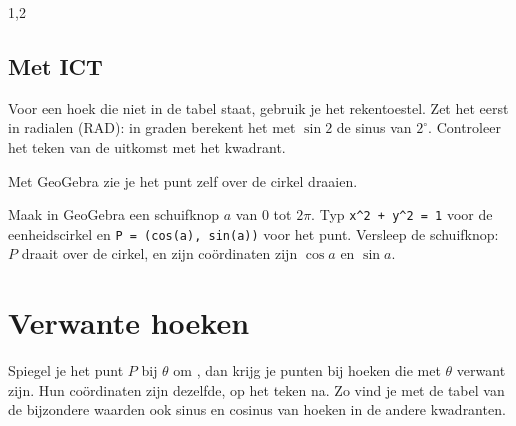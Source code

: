 \begin{oefeningen}
\end{oefeningen}
\begin{alleenvoor}{1,2}

\subsection{Met ICT}

Voor een hoek die niet in de tabel staat, gebruik je het rekentoestel. Zet het eerst in radialen (RAD): in graden berekent het met $\sin 2$ de sinus van $2^\circ$. Controleer het teken van de uitkomst met het kwadrant.


Met GeoGebra zie je het punt zelf over de cirkel draaien.

\begin{werkwijze}
Maak in GeoGebra een schuifknop $a$ van $0$ tot $2\pi$. Typ \texttt{x\^{}2 + y\^{}2 = 1} voor de eenheidscirkel en \texttt{P = (cos(a), sin(a))} voor het punt. Versleep de schuifknop: $P$ draait over de cirkel, en zijn coördinaten zijn $\cos a$ en $\sin a$.
\end{werkwijze}

\begin{oefeningen}
\end{oefeningen}
\end{alleenvoor}

\section{Verwante hoeken}

Spiegel je het punt $P$ bij $\theta$ om , dan krijg je punten bij hoeken die met $\theta$ verwant zijn. Hun coördinaten zijn dezelfde, op het teken na. Zo vind je met de tabel van de bijzondere waarden ook sinus en cosinus van hoeken in de andere kwadranten.

